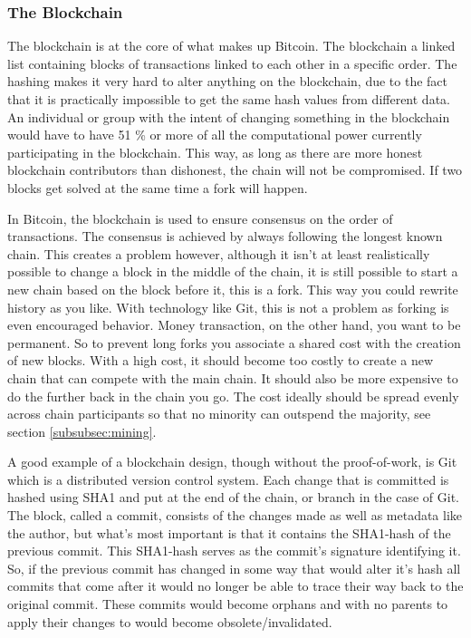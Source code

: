 \documentclass[12pt]{article}
\begin{document}
\subsubsection{The Blockchain} %

The blockchain is at the core of what makes up Bitcoin. The blockchain a linked list containing blocks of transactions linked to each other in a specific order. The hashing makes it very hard to alter anything on the blockchain, due to the fact that it is practically impossible to get the same hash values from different data. An individual or group with the intent of changing something in the blockchain would have to have 51 \% or more of all the computational power currently participating in the blockchain. This way, as long as there are more honest blockchain contributors than dishonest, the chain will not be compromised. If two blocks get solved at the same time a fork will happen. %

In Bitcoin, the blockchain is used to ensure consensus on the order of transactions. The consensus is achieved by always following the longest known chain. This creates a problem however, although it isn't at least realistically possible to change a block in the middle of the chain, it is still possible to start a new chain based on the block before it, this is a fork. This way you could rewrite history as you like. With technology like Git, this is not a problem as forking is even encouraged behavior. Money transaction, on the other hand, you want to be permanent. So to prevent long forks you associate a shared cost with the creation of new blocks. With a high cost, it should become too costly to create a new chain that can compete with the main chain. It should also be more expensive to do the further back in the chain you go. The cost ideally should be spread evenly across chain participants so that no minority can outspend the majority, see section \ref{subsubsec:mining}.

A good example of a blockchain design, though without the proof-of-work, is Git which is a distributed version control system. Each change that is committed is hashed using SHA1 and put at the end of the chain, or branch in the case of Git. The block, called a commit, consists of the changes made as well as metadata like the author, but what's most important is that it contains the SHA1-hash of the previous commit. This SHA1-hash serves as the commit's signature identifying it. So, if the previous commit has changed in some way that would alter it's hash all commits that come after it would no longer be able to trace their way back to the original commit. These commits would become orphans and with no parents to apply their changes to would become obsolete/invalidated.
\end{document}
